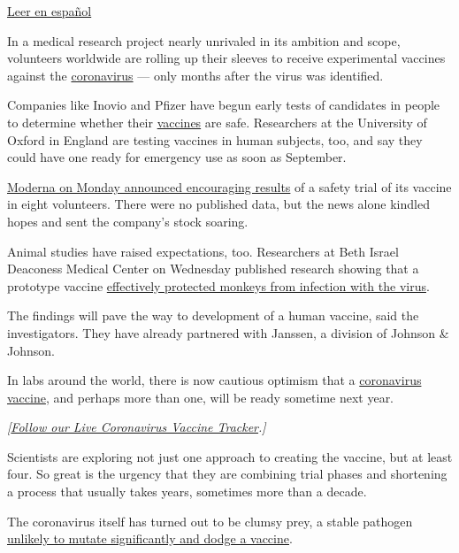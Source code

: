 \href{https://www.nytimes.com/es/2020/05/22/espanol/ciencia-y-tecnologia/vacuna-coronavirus.html}{Leer
en español}

In a medical research project nearly unrivaled in its ambition and
scope, volunteers worldwide are rolling up their sleeves to receive
experimental vaccines against the
\href{https://www.nytimes.com/2020/07/01/health/coronavirus-vaccine-trials.html}{coronavirus}
--- only months after the virus was identified.

Companies like Inovio and Pfizer have begun early tests of candidates in
people to determine whether their
\href{https://www.nytimes.com/2020/07/01/health/coronavirus-vaccine-trials.html}{vaccines}
are safe. Researchers at the University of Oxford in England are testing
vaccines in human subjects, too, and say they could have one ready for
emergency use as soon as September.

\href{https://www.nytimes.com/2020/05/18/health/coronavirus-vaccine-moderna.html}{Moderna
on Monday announced encouraging results} of a safety trial of its
vaccine in eight volunteers. There were no published data, but the news
alone kindled hopes and sent the company's stock soaring.

Animal studies have raised expectations, too. Researchers at Beth Israel
Deaconess Medical Center on Wednesday published research showing that a
prototype vaccine
\href{https://www.nytimes.com/2020/05/20/health/coronavirus-vaccine-harvard.html}{effectively
protected monkeys from infection with the virus}.

The findings will pave the way to development of a human vaccine, said
the investigators. They have already partnered with Janssen, a division
of Johnson \& Johnson.

In labs around the world, there is now cautious optimism that a
\href{https://www.nytimes.com/2020/06/03/us/politics/coronavirus-vaccine-trump-moderna.html}{coronavirus
vaccine}, and perhaps more than one, will be ready sometime next year.

\emph{{[}}\href{https://www.nytimes.com/interactive/2020/science/coronavirus-vaccine-tracker.html}{\emph{Follow
our Live Coronavirus Vaccine Tracker}}\emph{.{]}}

Scientists are exploring not just one approach to creating the vaccine,
but at least four. So great is the urgency that they are combining trial
phases and shortening a process that usually takes years, sometimes more
than a decade.

The coronavirus itself has turned out to be clumsy prey, a stable
pathogen
\href{https://www.nytimes.com/interactive/2020/04/30/science/coronavirus-mutations.html}{unlikely
to mutate significantly and dodge a vaccine}.

